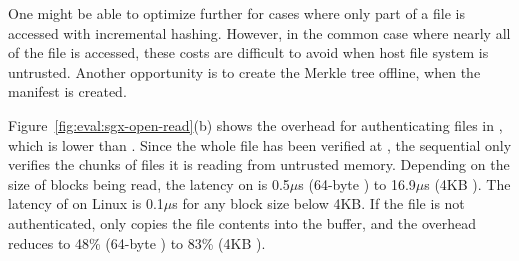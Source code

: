 One might be able to optimize further for cases where only part of a file is accessed
with incremental hashing.  However, in the common case where nearly all of the file is accessed,
these costs are difficult to avoid when host file system is untrusted.
Another opportunity 
is to create the Merkle tree offline, when the manifest is created.



Figure~\ref{fig:eval:sgx-open-read}(b)
shows the overhead for authenticating files in , which 
is lower than .
Since the whole file has been verified at , the sequential  only verifies the chunks of files it is reading from untrusted memory.
Depending on the size of blocks being read, the latency on \graphenesgx{} is 0.5$\mu$s (64-byte ) to 16.9$\mu$s (4KB ). The latency of  on Linux is \roughly{}0.1$\mu$s for any block size below 4KB.
If the file is not authenticated,
\graphenesgx{} only copies the file contents into the buffer, and the overhead reduces to 48\% (64-byte ) to 83\% (4KB ).





